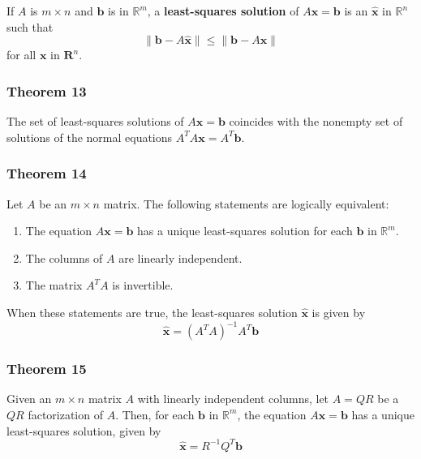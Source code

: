 \documentclass{article}
\begin{document}
If $A$ is $m\times n$ and $\mathbf{b}$ is in $\mathbb{R}^m$, a \textbf{least-squares solution} of
$A\mathbf{x}=\mathbf{b}$ is an $\mathbf{\hat{x}}$ in $\mathbb{R}^n$ such that
\[\|\mathbf{b}-A\mathbf{\hat{x}}\|\leq \|\mathbf{b} - A\mathbf{x}\|\]
for all $\mathbf{x}$ in $\mathbf{R}^n$.

\subsubsection*{Theorem 13}
The set of least-squares solutions of $A\mathbf{x}=\mathbf{b}$ coincides with the nonempty set of
solutions of the normal equations $A^T A\mathbf{x}=A^T\mathbf{b}$.

\subsubsection*{Theorem 14}
Let $A$ be an $m\times n$ matrix. The following statements are logically equivalent:
\begin{enumerate}
    \item The equation $A\mathbf{x}=\mathbf{b}$ has a unique least-squares solution for each
    $\mathbf{b}$ in $\mathbb{R}^m$.
    \item The columns of $A$ are linearly independent.
    \item The matrix $A^T A$ is invertible.
\end{enumerate}

When these statements are true, the least-squares solution $\mathbf{\hat{x}}$ is given by
\[\mathbf{\hat{x}}={(A^T A)}^{-1} A^T \mathbf{b}\]

\subsubsection*{Theorem 15}
Given an $m\times n$ matrix $A$ with linearly independent columns, let $A=QR$ be a $QR$
factorization of $A$. Then, for each $\mathbf{b}$ in $\mathbb{R}^m$, the equation
$A\mathbf{x}=\mathbf{b}$ has a unique least-squares solution, given by
\[\mathbf{\hat{x}}=R^{-1}Q^T \mathbf{b}\]
\end{document}
